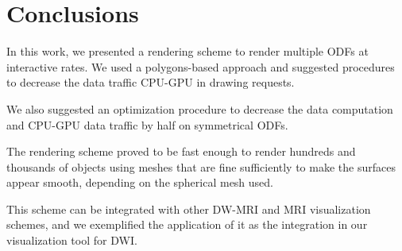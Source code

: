 \documentclass[twoside,twocolumn,10pt]{article}
\begin{document}










\section{Conclusions}
\label{sec::conclusions}

In this work, we presented a rendering scheme to render multiple ODFs at interactive rates. We used a polygons-based approach and suggested procedures to decrease the data traffic CPU-GPU in drawing requests.

We also suggested an optimization procedure to decrease the data computation and CPU-GPU data traffic by half on symmetrical ODFs.

The rendering scheme proved to be fast enough to render hundreds and thousands of objects using meshes that are fine sufficiently to make the surfaces appear smooth, depending on the spherical mesh used.

This scheme can be integrated with other DW-MRI and MRI visualization schemes, and we exemplified the application of it as the integration in our visualization tool for DWI.
\end{document}
